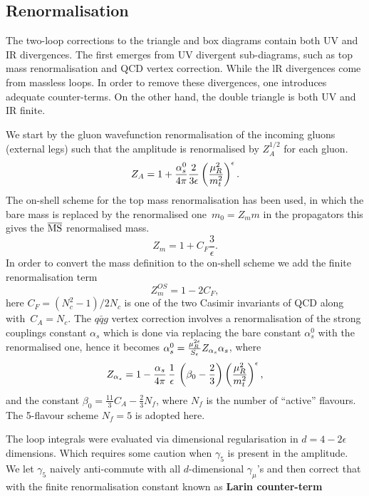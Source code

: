 \subsection{Renormalisation}
\label{subsec:ren}
The two-loop corrections to the triangle and box diagrams contain both UV and IR divergences. The first emerges from UV divergent sub-diagrams, such as top mass renormalisation and QCD vertex correction. While the lR divergences come from massless loops. In order to remove these divergences, one introduces adequate counter-terms.  On the other hand, the double triangle is both UV and IR finite.
\par  We start by the gluon wavefunction renormalisation of the incoming gluons  (external legs) such that the amplitude is renormalised by $ Z_A^{1/2}$ for each gluon.
\begin{equation}
	Z_A= 1+\frac{\alpha_s^0}{4 \pi} \frac{2}{3\epsilon} \left( \frac{\mu_R^2}{m_t^2} \right) ^\epsilon.
\end{equation}
 The on-shell scheme for the top mass renormalisation has been used, in which the bare mass is replaced by the renormalised one~$ m_0 = Z_m m$  in the propagators this gives the $\overline{\mathrm{MS}}$ renormalised mass. 
\begin{equation}
	Z_m = 1+ C_F \frac{3}{\epsilon}.
\end{equation}
In order to convert the mass definition to the on-shell scheme we add the finite renormalisation term
\begin{equation}
	Z^{OS}_m = 1- 2 C_F,
\end{equation}
here $C_F=(N_c^2-1)/2N_c$ is one of the two Casimir invariants of QCD along with~$ C_A=N_c$. 
The $q \bar q g$ vertex correction involves a renormalisation of the strong couplings constant $ \alpha_s$ which is done via replacing the bare constant $\alpha_s^0$ with the renormalised one, hence it becomes  $ \alpha^0_s = \frac{\mu_R^{2\epsilon}}{S_\epsilon}  Z_{\alpha_s} \alpha_s$, where
\begin{equation}
	Z_{\alpha_s} = 1- \frac{\alpha_s}{4 \pi} \, \frac{1}{ \epsilon}\,  \left( \beta_0-\frac{2}{3} \right) \left(\frac{\mu_R^2}{m_t^2} \right) ^\epsilon,
\end{equation}
and the constant $ \beta_0 = \frac{11}{3} C_A -\frac{2}{3}N_f$, where $N_f$ is the number of ``active'' flavours. The 5-flavour scheme $N_f=5$ is adopted here. 
\par The loop integrals were evaluated via dimensional regularisation in $d= 4-2\epsilon$ dimensions. Which requires some caution when $\gamma_5$ is present in the amplitude. We let $\gamma_5$ naively anti-commute with all $d$-dimensional $\gamma_\mu$'s and then correct that with the finite renormalisation constant known as \textbf{Larin counter-term}~\cite{Larin:1993tq}
